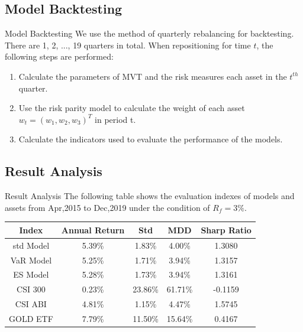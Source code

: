 \documentclass{beamer}
\begin{document}
\subsection{Model Backtesting}
\begin{frame}{Model Backtesting}
We use the method of quarterly rebalancing for backtesting. There are 1, 2, ..., 19 quarters in total. When repositioning for time $t$, the following steps are performed:
\begin{enumerate}
    \item Calculate the parameters of MVT and the risk measures each asset in the $ t^{th}$ quarter.
    \item Use the risk parity model to calculate the weight of each asset $w_{t} = (w_{1}, w_{2}, w_{3} )^{T}$ in period t.
    \item Calculate the indicators used to evaluate the performance of the models.
\end{enumerate}
\end{frame}

\subsection{Result Analysis}
\begin{frame}{Result Analysis}
The following table shows the evaluation indexes of models and assets from Apr,2015 to Dec,2019 under the condition of $R_f=3\%$.
\begin{table}[H]
    \centering
   \begin{tabular}{|c|c|c|c|c|}
    \hline
    {Index} & {Annual Return} &  {Std} &  {MDD} & {Sharp Ratio}  \\
    \hline
    {std Model} &     5.39\% &     1.83\% &     4.00\% &    1.3080    \\
    \hline
    {VaR Model} &     5.25\% &     1.71\% &     3.94\% &    1.3157   \\
    \hline
    {ES Model} &     5.28\% &     1.73\% &     3.94\% &    1.3161   \\
    \hline
    {CSI 300} &     0.23\% &    23.86\% &    61.71\% &   -0.1159    \\
    \hline
    {CSI ABI} &     4.81\% &     1.15\% &     4.47\% &    1.5745   \\
    \hline
    {GOLD ETF} &     7.79\% &    11.50\% &    15.64\% &    0.4167  \\
    \hline
    \end{tabular}  
    \label{Tab3}
\end{table}
\end{frame}
\end{document}
